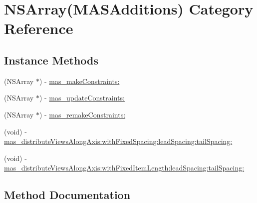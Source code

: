 \hypertarget{category_n_s_array_07_m_a_s_additions_08}{}\section{N\+S\+Array(M\+A\+S\+Additions) Category Reference}
\label{category_n_s_array_07_m_a_s_additions_08}
\subsection*{Instance Methods}
\begin{DoxyCompactItemize}
\item 
(N\+S\+Array $\ast$) -\/ \mbox{\hyperlink{category_n_s_array_07_m_a_s_additions_08_ac0a947aaf743d6851261d14d308cc3a5}{mas\+\_\+make\+Constraints\+:}}
\item 
(N\+S\+Array $\ast$) -\/ \mbox{\hyperlink{category_n_s_array_07_m_a_s_additions_08_a54c3e226bebbf0052f0b5c247fce4956}{mas\+\_\+update\+Constraints\+:}}
\item 
(N\+S\+Array $\ast$) -\/ \mbox{\hyperlink{category_n_s_array_07_m_a_s_additions_08_aad1689139742205a182a84fc7347702d}{mas\+\_\+remake\+Constraints\+:}}
\item 
(void) -\/ \mbox{\hyperlink{category_n_s_array_07_m_a_s_additions_08_a81232e7bce208f1e6c68e1cdbca472c9}{mas\+\_\+distribute\+Views\+Along\+Axis\+:with\+Fixed\+Spacing\+:lead\+Spacing\+:tail\+Spacing\+:}}
\item 
(void) -\/ \mbox{\hyperlink{category_n_s_array_07_m_a_s_additions_08_aeb0b335be13bec8e54d81c3cb1840b9c}{mas\+\_\+distribute\+Views\+Along\+Axis\+:with\+Fixed\+Item\+Length\+:lead\+Spacing\+:tail\+Spacing\+:}}
\end{DoxyCompactItemize}


\subsection{Method Documentation}
\mbox{\label{category_n_s_array_07_m_a_s_additions_08_aeb0b335be13bec8e54d81c3cb1840b9c}} 
